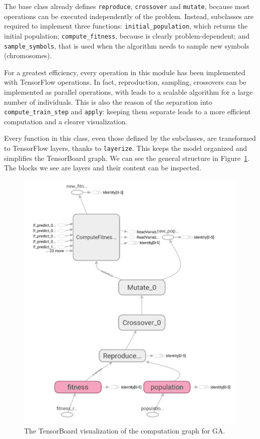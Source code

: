 The base class already defines \texttt{reproduce}, \texttt{crossover} and
\texttt{mutate}, because most operations can be executed independently of the
problem. Instead, subclasses are required to implement three functions:
\verb|initial_population|, which returns the initial population;
\verb|compute_fitness|, because is clearly problem-dependent; and
\verb|sample_symbols|, that is used when the algorithm needs to sample new
symbols (chromosomes).

For a greatest efficiency, every operation in this module has been implemented
with TensorFlow operations. In fact, reproduction, sampling, crossovers can be
implemented as parallel operations, with leads to a scalable algorithm for a
large number of individuals. This is also the reason of the separation into
\verb|compute_train_step| and \verb|apply|: keeping them separate leads to a
more efficient computation and a clearer visualization.

Every function in this class, even those defined by the subclasses, are
transformed to TensorFlow layers, thanks to \texttt{layerize}. This keeps the
model organized and simplifies the TensorBoard graph. We can see the general
structure in Figure~\ref{fig:tb-graph-ga}. The blocks we see are layers and
their content can be inspected.
\begin{figure}
	\centering
	\includegraphics[height=0.40\textheight]{./imgs/ga-graph.png}
	\caption{The TensorBoard visualization of the computation graph for GA.}
	\label{fig:tb-graph-ga}
\end{figure}

